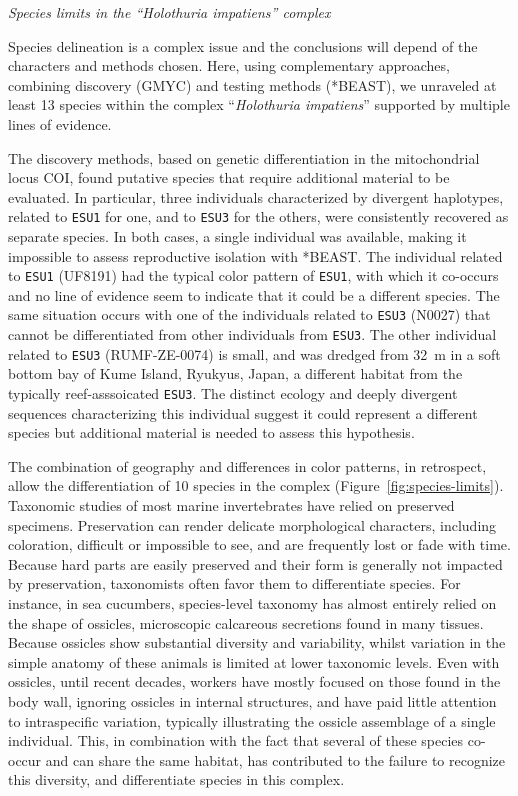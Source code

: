 \documentclass[12pt,letterpaper]{article}\usepackage[]{graphicx}\usepackage[]{color}
\renewcommand{\subsection}[1]{%
\bigskip
\begin{center}
\begin{large}
\normalfont\itshape #1
\end{large}
\end{center}}
\begin{document}
\subsection{Species limits in the \textit{``Holothuria impatiens''} complex}

Species delineation is a complex issue and the conclusions will depend of the
characters and methods chosen. Here, using complementary approaches, combining
discovery (GMYC) and testing methods (*BEAST), we unraveled at least 13 species
within the complex ``\textit{Holothuria impatiens}'' supported by multiple lines
of evidence.

The discovery methods, based on genetic differentiation in the mitochondrial
locus COI, found putative species that require additional material to be
evaluated. In particular, three individuals characterized by divergent
haplotypes, related to \texttt{ESU1} for one, and to \texttt{ESU3} for the
others, were consistently recovered as separate species. In both cases, a single
individual was available, making it impossible to assess reproductive isolation
with *BEAST. The individual related to \texttt{ESU1} (UF8191) had the typical
color pattern of \texttt{ESU1}, with which it co-occurs and no line of evidence
seem to indicate that it could be a different species. The same situation occurs
with one of the individuals related to \texttt{ESU3} (N0027) that cannot be
differentiated from other individuals from \texttt{ESU3}. The other individual
related to \texttt{ESU3} (RUMF-ZE-0074) is small, and was dredged from 32~m in a
soft bottom bay of Kume Island, Ryukyus, Japan, a different habitat from the
typically reef-asssoicated \texttt{ESU3}. The distinct ecology and deeply
divergent sequences characterizing this individual suggest it could represent a
different species but additional material is needed to assess this hypothesis.

The combination of geography and differences in color patterns, in retrospect,
allow the differentiation of 10 species in the complex
(Figure~\ref{fig:species-limits}). Taxonomic studies of most marine
invertebrates have relied on preserved specimens. Preservation can render
delicate morphological characters, including coloration, difficult or impossible
to see, and are frequently lost or fade with time. Because hard parts are easily
preserved and their form is generally not impacted by preservation, taxonomists
often favor them to differentiate species. For instance, in sea cucumbers,
species-level taxonomy has almost entirely relied on the shape of ossicles,
microscopic calcareous secretions found in many tissues. Because ossicles show
substantial diversity and variability, whilst variation in the simple anatomy of
these animals is limited at lower taxonomic levels. Even with ossicles, until
recent decades, workers have mostly focused on those found in the body wall,
ignoring ossicles in internal structures, and have paid little attention to
intraspecific variation, typically illustrating the ossicle assemblage of a
single individual. This, in combination with the fact that several of these
species co-occur and can share the same habitat, has contributed to the failure
to recognize this diversity, and differentiate species in this complex.
\end{document}
